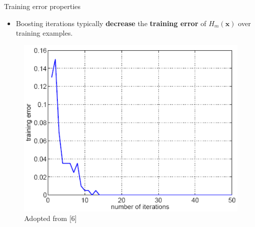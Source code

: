 \documentclass[serif, aspectratio=169]{beamer}
\begin{document}
\begin{frame}{Training error properties}
    \begin{itemize}
        \itemsep1em
        \justifying
        \item Boosting iterations typically \textbf{decrease} the \textbf{training error} of $H_m(\boldsymbol{x})$ over training examples.
    \end{itemize}
    \vfill
    \begin{center}
        \begin{figure}
            \includegraphics[width=\textwidth]{pic/boosting_train.png}
            {\scriptsize Adopted from [6]}
        \end{figure}
        \endminipage
    \end{center}
\end{frame}
\end{document}
